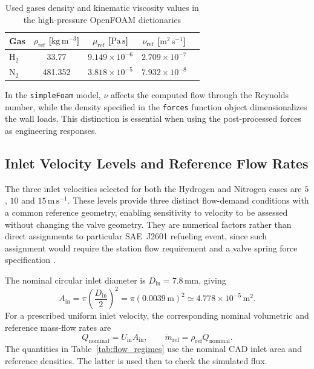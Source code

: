 \begin{table}[htbp]
\centering
\begin{tabular}{@{}lcccc@{}}
\toprule
\textbf{Gas} & $\rho_{\mathrm{ref}}$ [$\mathrm{kg\,m^{-3}}$] & $\mu_{\mathrm{ref}}$ [$\mathrm{Pa\,s}$] & $\nu_{\mathrm{ref}}$ [$\mathrm{m^2\,s^{-1}}$]\\
\midrule
$\mathrm{H}_2$ & 33.77  & $9.149\times10^{-6}$ & $2.709\times10^{-7}$\\
$\mathrm{N}_2$ & 481.352 & $3.818\times10^{-5}$ & $7.932\times10^{-8}$ \\
\bottomrule
\end{tabular}
\caption{Used gases density and kinematic viscosity values in the high-pressure OpenFOAM dictionaries}
\label{tab:fluid_properties_highp}
\end{table}

 In the \texttt{simpleFoam} model, $\nu$ affects the computed flow through the Reynolds number, while the density specified in the \texttt{forces} function object dimensionalizes the wall loads. This distinction is essential when using the post-processed forces as engineering responses.

\subsection{Inlet Velocity Levels and Reference Flow Rates}
\label{sec:inlet velocities}
The three inlet velocities selected for both the Hydrogen and Nitrogen cases are $5$, $10$ and $15\,\mathrm{m\,s^{-1}}$. These levels provide three distinct flow-demand conditions with a common reference geometry, enabling sensitivity to velocity to be assessed without changing the valve geometry. They are numerical factors rather than direct assignments to particular SAE~J2601 refueling event, since such assignment would require the station flow requirement and a valve spring force specification \cite{sae_j2601}. 

The nominal circular inlet diameter is $D_{\mathrm{in}}=7.8\,\mathrm{mm}$, giving
\begin{equation}
    A_{\mathrm{in}}=\pi\left(\frac{D_{\mathrm{in}}}{2}\right)^2
    =\pi(0.0039\,\mathrm{m})^2\simeq4.778\times10^{-5}\,\mathrm{m^2}.
    \label{eq:inlet_area}
\end{equation}
For a prescribed uniform inlet velocity, the corresponding nominal volumetric and reference mass-flow rates are
\begin{equation}
    Q_{\mathrm{nominal}}=U_{\mathrm{in}}A_{\mathrm{in}},
    \qquad
    \dot m_{\mathrm{ref}}=\rho_{\mathrm{ref}}Q_{\mathrm{nominal}}.
    \label{eq:inlet_flow}
\end{equation}
The quantities in Table~\ref{tab:flow_regimes} use the nominal CAD inlet area and reference densities. The latter is used then to check the simulated flux.

